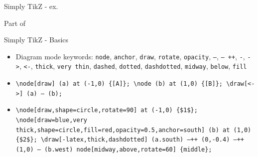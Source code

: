 \documentclass[aspectratio=169]{beamer}
\begin{document}
\begin{frame}{Simply TikZ - ex.}
    \vspace{-10pt}
    
    \footnotesize Part of 
\end{frame}

\begin{frame}{Simply TikZ - Basics}

    
    \begin{itemize}
        \item<+-> Diagram mode keywords: \texttt{node}, \texttt{anchor}, \texttt{draw}, \texttt{rotate}, \texttt{opacity}, \texttt{--},  \texttt{-- ++}, \texttt{-}, \texttt{->}, \texttt{<-}, \texttt{thick}, \texttt{very thin}, \texttt{dashed}, \texttt{dotted}, \texttt{dashdotted}, \texttt{midway}, \texttt{below}, \texttt{fill}
        
        \item<+-> \texttt{\textbackslash node[draw] (a) at (-1,0) \{[A]\}; \textbackslash node (b) at (1,0) \{[B]\}; \textbackslash draw[<->] (a) -- (b);}
        \begin{center}
        \end{center}
        
        \item<+-> \texttt{\textbackslash node[draw,shape=circle,rotate=90] at (-1,0) \{\$1\$\}; \textbackslash node[draw=blue,very thick,shape=circle,fill=red,opacity=0.5,anchor=south] (b) at (1,0) \{\$2\$\}; \textbackslash draw[-latex,thick,dashdotted] (a.south) --++ (0,-0.4) --++ (1,0) -- (b.west) node[midway,above,rotate=60] \{middle\};}
        \begin{center}
        \end{center}
        
    \end{itemize}
\end{frame}
\end{document}
